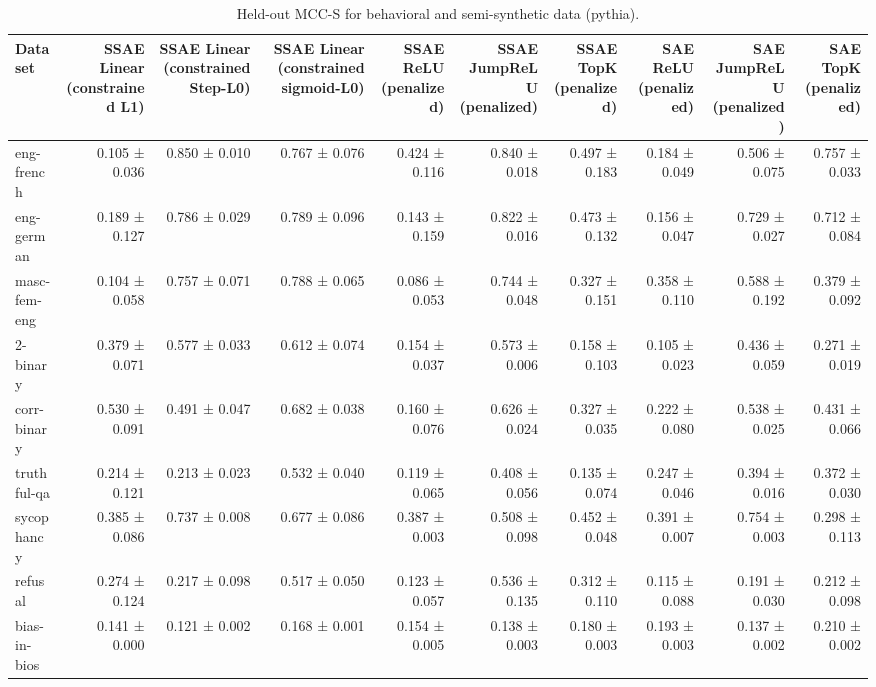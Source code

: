 \begin{table}[t]
\centering
\caption{Held-out MCC-S for behavioral and semi-synthetic data (pythia).}
\label{tab:all-datasets-pythia-mcc-s}
\begin{tabular}{lrrrrrrrrr}
\toprule
Dataset & SSAE Linear (constrained L1) & SSAE Linear (constrained Step-L0) & SSAE Linear (constrained sigmoid-L0) & SSAE ReLU (penalized) & SSAE JumpReLU (penalized) & SSAE TopK (penalized) & SAE ReLU (penalized) & SAE JumpReLU (penalized) & SAE TopK (penalized) \\
\midrule
eng-french & 0.105 ± 0.036 & 0.850 ± 0.010 & 0.767 ± 0.076 & 0.424 ± 0.116 & 0.840 ± 0.018 & 0.497 ± 0.183 & 0.184 ± 0.049 & 0.506 ± 0.075 & 0.757 ± 0.033 \\
eng-german & 0.189 ± 0.127 & 0.786 ± 0.029 & 0.789 ± 0.096 & 0.143 ± 0.159 & 0.822 ± 0.016 & 0.473 ± 0.132 & 0.156 ± 0.047 & 0.729 ± 0.027 & 0.712 ± 0.084 \\
masc-fem-eng & 0.104 ± 0.058 & 0.757 ± 0.071 & 0.788 ± 0.065 & 0.086 ± 0.053 & 0.744 ± 0.048 & 0.327 ± 0.151 & 0.358 ± 0.110 & 0.588 ± 0.192 & 0.379 ± 0.092 \\
2-binary & 0.379 ± 0.071 & 0.577 ± 0.033 & 0.612 ± 0.074 & 0.154 ± 0.037 & 0.573 ± 0.006 & 0.158 ± 0.103 & 0.105 ± 0.023 & 0.436 ± 0.059 & 0.271 ± 0.019 \\
corr-binary & 0.530 ± 0.091 & 0.491 ± 0.047 & 0.682 ± 0.038 & 0.160 ± 0.076 & 0.626 ± 0.024 & 0.327 ± 0.035 & 0.222 ± 0.080 & 0.538 ± 0.025 & 0.431 ± 0.066 \\
truthful-qa & 0.214 ± 0.121 & 0.213 ± 0.023 & 0.532 ± 0.040 & 0.119 ± 0.065 & 0.408 ± 0.056 & 0.135 ± 0.074 & 0.247 ± 0.046 & 0.394 ± 0.016 & 0.372 ± 0.030 \\
sycophancy & 0.385 ± 0.086 & 0.737 ± 0.008 & 0.677 ± 0.086 & 0.387 ± 0.003 & 0.508 ± 0.098 & 0.452 ± 0.048 & 0.391 ± 0.007 & 0.754 ± 0.003 & 0.298 ± 0.113 \\
refusal & 0.274 ± 0.124 & 0.217 ± 0.098 & 0.517 ± 0.050 & 0.123 ± 0.057 & 0.536 ± 0.135 & 0.312 ± 0.110 & 0.115 ± 0.088 & 0.191 ± 0.030 & 0.212 ± 0.098 \\
bias-in-bios & 0.141 ± 0.000 & 0.121 ± 0.002 & 0.168 ± 0.001 & 0.154 ± 0.005 & 0.138 ± 0.003 & 0.180 ± 0.003 & 0.193 ± 0.003 & 0.137 ± 0.002 & 0.210 ± 0.002 \\
\bottomrule
\end{tabular}
\end{table}
